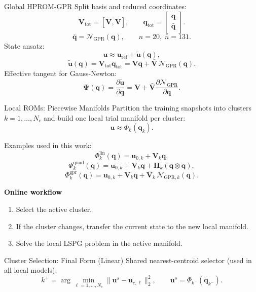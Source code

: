 \documentclass[aspectratio=169]{beamer}
\begin{document}
{\begin{frame}{Global HPROM-GPR}
\small
Split basis and reduced coordinates:
\[
\mathbf{V}_{\mathrm{tot}}=[\mathbf{V},\bar{\mathbf{V}}],
\qquad
\mathbf{q}_{\mathrm{tot}}=
\begin{bmatrix}
\mathbf{q}\\
\bar{\mathbf{q}}
\end{bmatrix}.
\]
\[
\bar{\mathbf{q}}=\mathcal{N}_{\mathrm{GPR}}(\mathbf{q}),
\qquad
n=20,\;\bar{n}=131.
\]
State ansatz:
\[
\mathbf{u}\approx
\mathbf{u}_{\mathrm{ref}}
+\widetilde{\mathbf{u}}(\mathbf{q}),
\]
\[
\widetilde{\mathbf{u}}(\mathbf{q})
=\mathbf{V}_{\mathrm{tot}}\mathbf{q}_{\mathrm{tot}}
=\mathbf{V}\mathbf{q}
+\bar{\mathbf{V}}\,\mathcal{N}_{\mathrm{GPR}}(\mathbf{q}).
\]
Effective tangent for Gauss-Newton:
\[
\mathbf{\Psi}(\mathbf{q})
=\frac{\partial\widetilde{\mathbf{u}}}{\partial\mathbf{q}}
=\mathbf{V}
+\bar{\mathbf{V}}\frac{\partial\mathcal{N}_{\mathrm{GPR}}}{\partial\mathbf{q}}.
\]
\end{frame}

\begin{frame}{Local ROMs: Piecewise Manifolds}
\small
Partition the training snapshots into clusters $k=1,\dots,N_c$ and build one local trial manifold per cluster:
\[
\mathbf u \approx \Phi_k(\mathbf q_k).
\]

Examples used in this work:
\[
\Phi_k^{\mathrm{lin}}(\mathbf q)
=
\mathbf u_{0,k}+\mathbf V_k\mathbf q,
\]
\[
\Phi_k^{\mathrm{quad}}(\mathbf q)
=
\mathbf u_{0,k}+\mathbf V_k\mathbf q+\mathbf H_k(\mathbf q\otimes\mathbf q),
\]
\[
\Phi_k^{\mathrm{gpr}}(\mathbf q)
=
\mathbf u_{0,k}+\mathbf V_k\mathbf q+\bar{\mathbf V}_k\,\mathcal N_{\mathrm{GPR},k}(\mathbf q).
\]

\vspace{0.3em}
\textbf{Online workflow}
\begin{enumerate}
\item Select the active cluster.
\item If the cluster changes, transfer the current state to the new local manifold.
\item Solve the local LSPG problem in the active manifold.
\end{enumerate}
\end{frame}

\begin{frame}{Cluster Selection: Final Form (Linear)}
\small
Shared nearest-centroid selector (used in all local models):
\[
k^+=\arg\min_{\ell=1,\dots,N_c}\|\mathbf u^s-\mathbf u_{c,\ell}\|_2^2,
\qquad
\mathbf u^s=\Phi_{k^-}(\mathbf q_{k^-}).
\]


\end{frame}}
\end{document}
